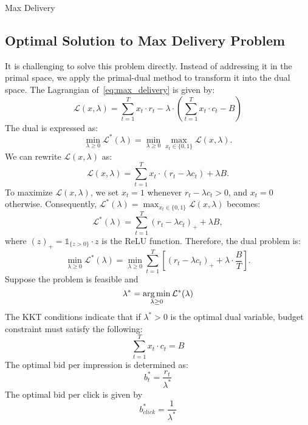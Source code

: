 \documentclass[../main.tex]{subfiles}
\begin{document}
\begin{section}{Max Delivery}
	
	

	
	\subsection* {Optimal Solution to Max Delivery Problem}
		
		It is challenging to solve this problem directly. Instead of addressing it in the primal space, we apply the primal-dual method to transform it into the dual space. The Lagrangian of~\eqref{eq:max_delivery} is given by:
		\begin{equation*} \label{eq:max_delivery_dual}
			\mathcal{L}(x, \lambda) = \sum_{t=1}^T x_t \cdot r_t  - \lambda \cdot \left( \sum_{t=1}^{T} x_t \cdot c_t  - B  \right)
		\end{equation*}
		The dual  is expressed as:
		\begin{equation*}
			\min_{\lambda \geq 0} \mathcal{L}^*(\lambda) = \min_{\lambda \geq 0} \max_{x_t \in \{0,1\}} \mathcal{L}(x, \lambda).
		\end{equation*}
		We can rewrite \(\mathcal{L}(x, \lambda)\) as:
		\begin{equation*}
			\mathcal{L}(x, \lambda) = \sum_{t=1}^T  x_t \cdot (r_t - \lambda c_t)  + \lambda B.
		\end{equation*}
		To maximize \(\mathcal{L}(x, \lambda)\), we set \(x_t = 1\) whenever \(r_t - \lambda c_t > 0\), and \(x_t = 0\) otherwise. Consequently, \(\mathcal{L}^*(\lambda) = \max_{x_t \in \{0,1\}} \mathcal{L}(x, \lambda)\) becomes:
		\begin{equation*}
			\mathcal{L}^*(\lambda) = \sum_{t=1}^{T} (r_t - \lambda c_t)_{+}  + \lambda B,
		\end{equation*}
		where \((z)_{+} = \mathds{1}_{ \{z>0\}} \cdot z\) is the ReLU function. Therefore, the dual problem is:
		\begin{equation}
			\min_{\lambda \geq 0}  \mathcal{L}^*(\lambda) = \min_{\lambda \geq 0}  \sum_{t=1}^{T} \left[ (r_t - \lambda c_t)_{+} + \lambda \cdot \frac{B}{T} \right].
		\end{equation}
	Suppose the problem is feasible and 
	\[
	\lambda^* = \operatorname*{arg\,min}_{\lambda \geq 0} \mathcal{L}^*(\lambda)
	\]
	The KKT conditions indicate that if $\lambda^* > 0$ is the optimal dual variable, budget constraint must satisfy the following:
	\[
	\sum_{t=1}^{T} x_t \cdot c_t = B
	\]
	The optimal bid per impression is determined as: 
	\begin{equation*}
		b_t^* = \frac{r_t}{ \lambda^*}
	\end{equation*}
	The optimal bid per click is given by 
	\begin{equation}
		b^*_{click} = \frac{1}{\lambda^*}
	\end{equation}



\end{section}
\end{document}
